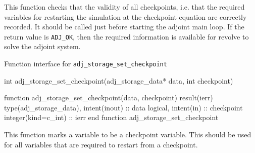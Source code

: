 This function checks that the validity of all checkpoints, i.e. that the required variables for restarting the simulation at the checkpoint equation are correctly recorded.
It should be called just before starting the adjoint main loop.
If the return value is \texttt{ADJ_OK}, then the required information is available for revolve to solve the adjoint system.


\begin{boxwithtitle}{Function interface for \texttt{adj_storage_set_checkpoint}}
\begin{minipage}{\columnwidth}
\begin{ccode}
int adj_storage_set_checkpoint(adj_storage_data* data, int checkpoint)
\end{ccode}
\begin{fortrancode}
function adj_storage_set_checkpoint(data, checkpoint) result(ierr)
  type(adj_storage_data), intent(inout) :: data
  logical, intent(in) :: checkpoint
  integer(kind=c_int) :: ierr
end function adj_storage_set_checkpoint
\end{fortrancode}
\end{minipage}
\end{boxwithtitle}

This function marks a variable to be a checkpoint variable. This should be used for all variables that are required to restart from a checkpoint.


